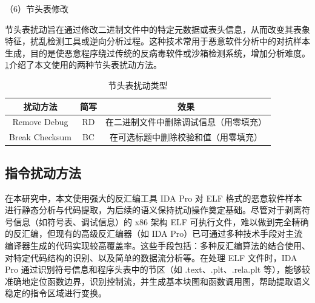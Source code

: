 

（6）节头表修改


节头表扰动旨在通过修改二进制文件中的特定元数据或表头信息，从而改变其表象特征，扰乱检测工具或逆向分析过程。这种技术常用于恶意软件分析中的对抗样本生成，目的是使恶意程序绕过传统的反病毒软件或沙箱检测系统，增加分析难度。\ref{tab:4.5}介绍了本文使用的两种节头表扰动方法。


\begin{table}[htbp]
	\centering
	\caption{节头表扰动类型}\label{tab:4.5}
	\begin{tabular*}{0.9\textwidth}{@{\extracolsep{\fill}}ccc}
		\toprule
		扰动方法 & 简写 & 效果 \\
		\midrule
		Remove Debug & RD & 在二进制文件中删除调试信息（用零填充） \\
		Break Checksum & BC & 在可选标题中删除校验和值（用零填充） \\
		\bottomrule
	\end{tabular*}
\end{table}



\subsection{指令扰动方法}

在本研究中，本文使用强大的反汇编工具 IDA Pro 对 ELF 格式的恶意软件样本进行静态分析与代码提取，为后续的语义保持扰动操作奠定基础。尽管对于剥离符号信息（如符号表、调试信息）的 x86 架构 ELF 可执行文件，难以做到完全精确的反汇编，但现有的高级反汇编器（如 IDA Pro）已可通过多种技术手段对主流编译器生成的代码实现较高覆盖率。这些手段包括：多种反汇编算法的结合使用、对特定代码结构的识别、以及简单的数据流分析等。在处理 ELF 文件时，IDA Pro 通过识别符号信息和程序头表中的节区（如 .text、.plt、.rela.plt 等），能够较准确地定位函数边界，识别控制流，并生成基本块图和函数调用图，帮助提取语义稳定的指令区域进行变换。

